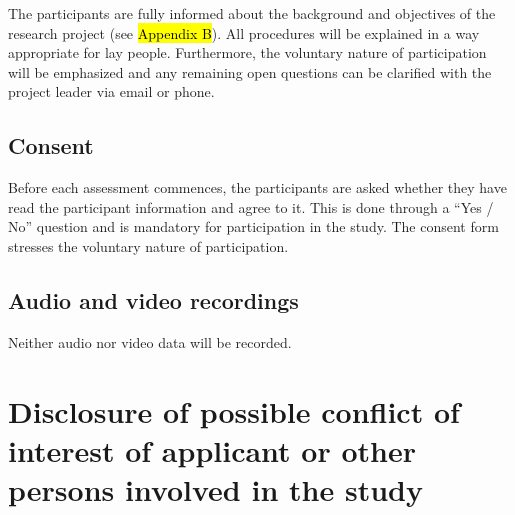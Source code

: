 \documentclass[11pt,twoside,a4paper]{article}
\begin{document}

The participants are fully informed about the background and objectives of the research project (see \hl{Appendix B}).
All procedures will be explained in a way appropriate for lay people.
Furthermore, the voluntary nature of participation will be emphasized and any remaining open questions can be clarified with the project leader via email or phone.

\subsection{Consent}


Before each assessment commences, the participants are asked whether they have read the participant information and agree to it.
This is done through a ``Yes / No'' question and is mandatory for participation in the study.
The consent form stresses the voluntary nature of participation.

\subsection{Audio and video recordings}


Neither audio nor video data will be recorded.

\section{Disclosure of possible conflict of interest of applicant or other persons involved in the study}
\end{document}
